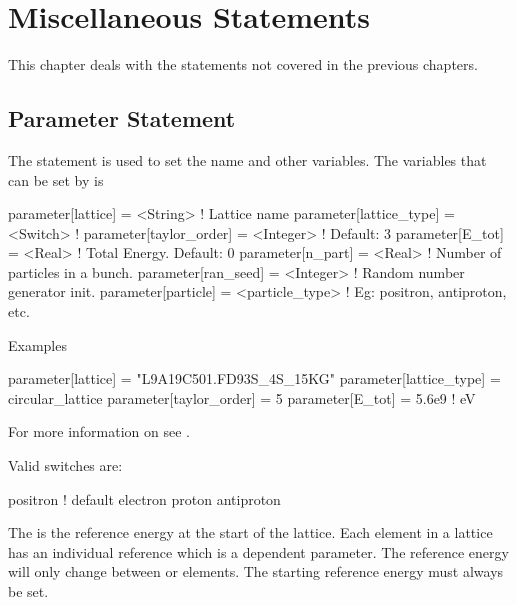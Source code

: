 \chapter{Miscellaneous Statements}

This chapter deals with the statements not covered in the previous chapters.

\section{Parameter Statement}
\label{s:param}


The  statement is used to set the  name and
other variables.  The variables that can be set by  is
\begin{example}
  parameter[lattice]      = <String>        ! Lattice name 
  parameter[lattice_type] = <Switch>        ! 
  parameter[taylor_order] = <Integer>       ! Default: 3
  parameter[E_tot]        = <Real>          ! Total Energy. Default: 0
  parameter[n_part]       = <Real>          ! Number of particles in a bunch.
  parameter[ran_seed]     = <Integer>       ! Random number generator init.
  parameter[particle]     = <particle_type> ! Eg: positron, antiproton, etc.
\end{example}

\noindent
Examples
\begin{example}
  parameter[lattice]      = "L9A19C501.FD93S_4S_15KG"
  parameter[lattice_type] = circular_lattice
  parameter[taylor_order] = 5
  parameter[E_tot]  = 5.6e9    ! eV
\end{example}

For more information on  see .

Valid  switches are:
\begin{example}
  positron  ! default
  electron
  proton
  antiproton
\end{example}

The  is the reference energy at the start of the
lattice.  Each element in a lattice has an individual reference
 which is a dependent parameter. 
The reference energy will only change between  or
 elements. The starting reference energy must always be set.

